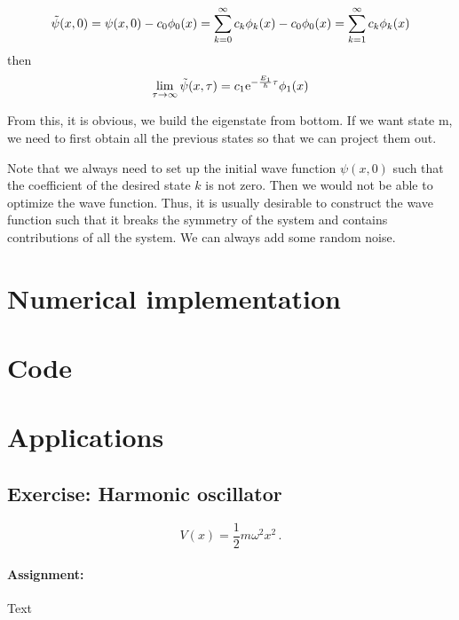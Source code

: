 \begin{equation}
    \Tilde{\psi}(x,0) = \psi(x,0) - c_0 \phi_0(x) = \sum_{k=0}^\infty c_k \phi_k(x) - c_0 \phi_0(x) = \sum_{k=1}^\infty c_k \phi_k(x)
\end{equation}
then
\begin{equation}
    \lim_{\tau\to\infty} \Tilde{\psi}(x,\tau) = c_1  \mathrm{e}^{-\frac{E_1}{\hbar}\tau} \phi_1(x)
\end{equation}

From this, it is obvious, we build the eigenstate from bottom. If we want state m, we need to first obtain all the previous states so that we can project them out. 

Note that we always need to set up the initial wave function $\psi(x,0)$ such that the coefficient of the desired state $k$ is not zero. Then we would not be able to optimize the wave function. Thus, it is usually desirable to construct the wave function such that it breaks the symmetry of the system and contains contributions of all the system. We can always add some random noise.

\section{Numerical implementation}



\section{Code}

\lstset{style=mystyle}


\section{Applications}

\subsection*{Exercise: Harmonic oscillator}

\begin{equation*}
    V(x) = \frac{1}{2}m\omega^2x^2 \, .
\end{equation*}

\paragraph{Assignment:} Text


